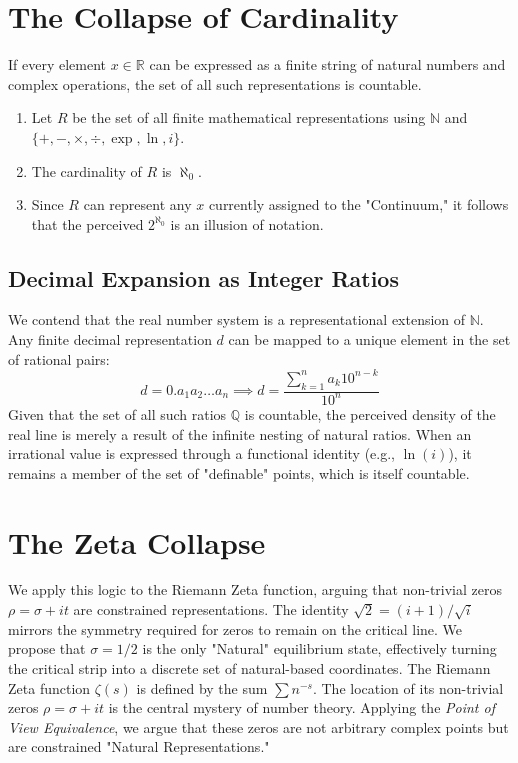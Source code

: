 \documentclass[12pt,a4paper]{article}
\begin{document}
\section{The Collapse of Cardinality}
If every element $x \in \mathbb{R}$ can be expressed as a finite string of natural numbers and complex operations, the set of all such representations is countable.
\begin{enumerate}
    \item Let $R$ be the set of all finite mathematical representations using $\mathbb{N}$ and $\{+, -, \times, \div, \exp, \ln, i\}$.
    \item The cardinality of $R$ is $\aleph_0$.
    \item Since $R$ can represent any $x$ currently assigned to the "Continuum," it follows that the perceived $2^{\aleph_0}$ is an illusion of notation.
\end{enumerate}
\subsection{Decimal Expansion as Integer Ratios}
We contend that the real number system is a representational extension of $\mathbb{N}$. Any finite decimal representation $d$ can be mapped to a unique element in the set of rational pairs:
\begin{equation}
    d = 0.a_1 a_2 \dots a_n \implies d = \frac{\sum_{k=1}^n a_k 10^{n-k}}{10^n}
\end{equation}
Given that the set of all such ratios $\mathbb{Q}$ is countable, the perceived density of the real line is merely a result of the infinite nesting of natural ratios. When an irrational value is expressed through a functional identity (e.g., $\ln(i)$), it remains a member of the set of "definable" points, which is itself countable.
\section{The Zeta Collapse}
We apply this logic to the Riemann Zeta function, arguing that non-trivial zeros $\rho = \sigma + it$ are constrained representations. The identity $\sqrt{2} = (i+1)/\sqrt{i}$ mirrors the symmetry required for zeros to remain on the critical line. We propose that $\sigma = 1/2$ is the only "Natural" equilibrium state, effectively turning the critical strip into a discrete set of natural-based coordinates.
The Riemann Zeta function $\zeta(s)$ is defined by the sum $\sum n^{-s}$. The location of its non-trivial zeros $\rho = \sigma + it$ is the central mystery of number theory. Applying the \textit{Point of View Equivalence}, we argue that these zeros are not arbitrary complex points but are constrained "Natural Representations."
\end{document}
